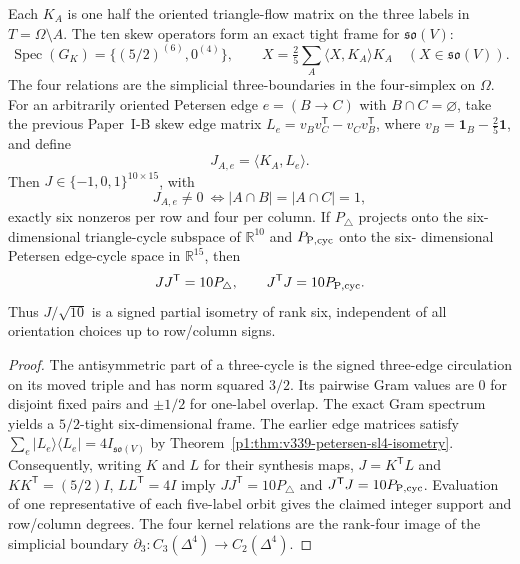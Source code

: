 \documentclass[11pt]{article}
\begin{document}
\begin{theorem}
\label{p1:thm:v342-triangle-petersen-cycle-isometry}
Each $K_A$ is one half the oriented triangle-flow matrix on the
three labels in $T=\Omega\setminus A$.  The ten skew operators form
an exact tight frame for $\mathfrak{so}(V)$:
\[
 \operatorname{Spec}(G_K)=\{(5/2)^{(6)},0^{(4)}\},\qquad
 X=\tfrac25\sum_A\langle X,K_A\rangle K_A
 \quad(X\in\mathfrak{so}(V)).
\]
The four relations are the simplicial three-boundaries in the
four-simplex on $\Omega$.
For an arbitrarily oriented Petersen edge $e=(B\to C)$ with
$B\cap C=\varnothing$, take the previous Paper~I-B skew edge
matrix $L_e=v_Bv_C^{\mathsf T}-v_Cv_B^{\mathsf T}$, where
$v_B=\mathbf1_B-\tfrac25\mathbf1$, and define
\[
 J_{A,e}=\langle K_A,L_e\rangle.
\]
Then $J\in\{-1,0,1\}^{10\times15}$, with
\[
 J_{A,e}\ne0\ \Longleftrightarrow
 |A\cap B|=|A\cap C|=1,
\]
exactly six nonzeros per row and four per column.  If
$P_{\triangle}$ projects onto the six-dimensional triangle-cycle
subspace of $\mathbb R^{10}$ and $P_{\rm P,cyc}$ onto the six-
dimensional Petersen edge-cycle space in $\mathbb R^{15}$, then
\[
 JJ^{\mathsf T}=10P_{\triangle},\qquad
 J^{\mathsf T}J=10P_{\rm P,cyc}.
\]
Thus $J/\sqrt{10}$ is a signed partial isometry of rank six,
independent of all orientation choices up to row/column signs.
\end{theorem}
\begin{proof}
The antisymmetric part of a three-cycle is the signed three-edge
circulation on its moved triple and has norm squared $3/2$.
Its pairwise Gram values are $0$ for disjoint fixed pairs and
$\pm1/2$ for one-label overlap.  The exact Gram spectrum yields
a $5/2$-tight six-dimensional frame.  The earlier edge matrices
satisfy $\sum_e|L_e\rangle\langle L_e|=4I_{\mathfrak{so}(V)}$
by Theorem~\ref{p1:thm:v339-petersen-sl4-isometry}.  Consequently,
writing $K$ and $L$ for their synthesis maps, $J=K^{\mathsf T}L$
and $KK^{\mathsf T}=(5/2)I$, $LL^{\mathsf T}=4I$ imply
$JJ^{\mathsf T}=10P_{\triangle}$ and
$J^{\mathsf T}J=10P_{\rm P,cyc}$.  Evaluation of one representative
of each five-label orbit gives the claimed integer support and
row/column degrees.  The four kernel relations are the rank-four
image of the simplicial boundary $\partial_3:C_3(\Delta^4)\to
C_2(\Delta^4)$.
\end{proof}
\end{document}
